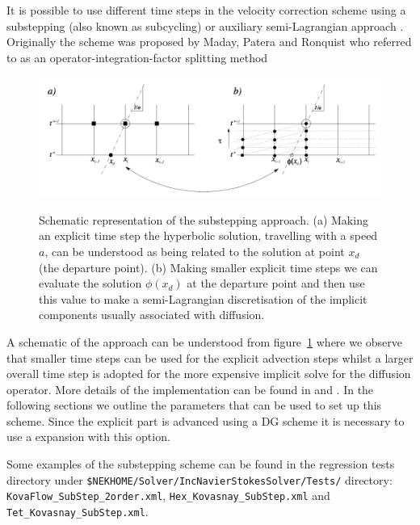 It is possible to use different time steps in the velocity correction
scheme using a substepping (also known as subcycling) \cite{Sh03} or
auxiliary semi-Lagrangian approach \cite{XiShDoKa}. Originally the
scheme was proposed by Maday, Patera and Ronquist who referred to as
an operator-integration-factor splitting method \cite{MaPaRo}

\begin{figure}[!htbp]
\label{fig.substep}
  \centering
 {\includegraphics[width=1 \textwidth]{img/substepimage.png}}
   \caption {Schematic representation of the substepping approach. (a)
     Making an explicit time step the hyperbolic solution, travelling
     with a speed $a$, can be understood as being related to the
     solution at point $x_d$ (the departure point). (b) Making smaller
     explicit time steps we can evaluate the solution $\phi(x_d)$ at
     the departure point and then use this value to make a
     semi-Lagrangian discretisation of the implicit components usually
     associated with diffusion.}
\end{figure}


A schematic of the approach can be understood from figure~\ref{fig.substep}
where we observe that smaller time steps can be used
for the explicit advection steps whilst a larger overall time step is
adopted for the more expensive implicit solve for the diffusion
operator. More details of the implementation can be found in
\cite{XiShDoKa} and \cite{Sh03}. In the following sections we outline
the parameters that can be used to set up this scheme. Since the
explicit part is advanced using a DG scheme it is necessary to use a
 expansion with this option.

\begin{notebox}
Some examples of the substepping scheme can be found in the regression tests
directory under
\texttt{\${NEKHOME}/Solver/IncNavierStokesSolver/Tests/} directory:
\texttt{KovaFlow\_SubStep\_2order.xml},
\texttt{Hex\_Kovasnay\_SubStep.xml} and
\texttt{Tet\_Kovasnay\_SubStep.xml}.
\end{notebox}

